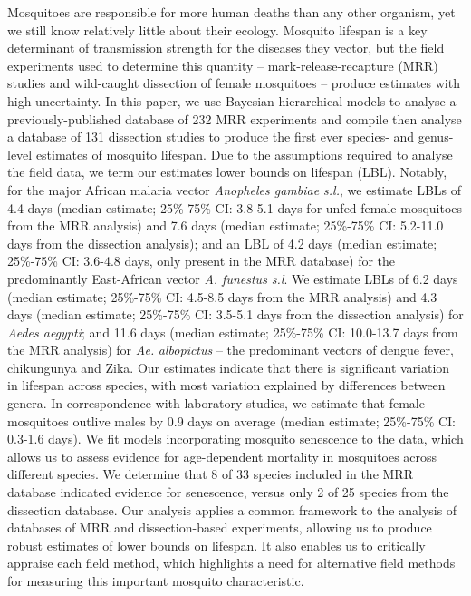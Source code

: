 \documentclass[]{article}
\begin{document}
Mosquitoes are responsible for more human deaths than any other
organism, yet we still know relatively little about their ecology.
Mosquito lifespan is a key determinant of transmission strength for the
diseases they vector, but the field experiments used to determine this
quantity -- mark-release-recapture (MRR) studies and wild-caught
dissection of female mosquitoes -- produce estimates with high
uncertainty. In this paper, we use Bayesian hierarchical models to
analyse a previously-published database of 232 MRR experiments and
compile then analyse a database of 131 dissection studies to produce the
first ever species- and genus-level estimates of mosquito lifespan. Due
to the assumptions required to analyse the field data, we term our
estimates lower bounds on lifespan (LBL). Notably, for the major African
malaria vector \emph{Anopheles gambiae s.l.}, we estimate LBLs of 4.4
days (median estimate; 25\%-75\% CI: 3.8-5.1 days for unfed female
mosquitoes from the MRR analysis) and 7.6 days (median estimate;
25\%-75\% CI: 5.2-11.0 days from the dissection analysis); and an LBL of
4.2 days (median estimate; 25\%-75\%
CI: 3.6-4.8 days, only present in the MRR database) for the
predominantly East-African vector \emph{A. funestus s.l}. We estimate
LBLs of 6.2 days (median estimate; 25\%-75\% CI: 4.5-8.5 days from the
MRR analysis) and 4.3 days (median estimate; 25\%-75\% CI: 3.5-5.1 days
from the dissection analysis) for \emph{Aedes aegypti}; and 11.6 days
(median estimate; 25\%-75\% CI: 10.0-13.7 days from the MRR analysis)
for \emph{Ae.} \emph{albopictus} -- the predominant vectors of dengue
fever, chikungunya and Zika. Our estimates indicate that there is
significant variation in lifespan across species, with most variation
explained by differences between genera. In correspondence with
laboratory studies, we estimate that female mosquitoes outlive males by
0.9 days on average (median estimate; 25\%-75\% CI: 0.3-1.6 days). We
fit models incorporating mosquito senescence to the data, which allows
us to assess evidence for age-dependent mortality in mosquitoes across
different species. We determine that 8 of 33 species included in the MRR
database indicated evidence for senescence, versus only 2 of 25 species
from the dissection database. Our analysis applies a common framework to
the analysis of databases of MRR and dissection-based experiments,
allowing us to produce robust estimates of lower bounds on lifespan. It
also enables us to critically appraise each field method, which
highlights a need for alternative field methods for measuring this
important mosquito characteristic.
\end{document}
